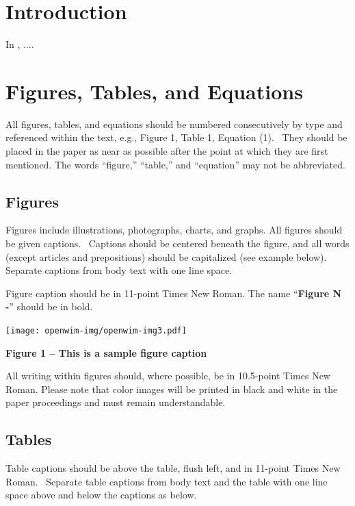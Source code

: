 \documentclass[a4paper]{article}
\begin{document}
\section{Introduction}
{
In , ....

\iffalse

\section{Figures, Tables, and Equations}
{
All figures, tables, and equations should be numbered consecutively by
type and referenced within the text, e.g., Figure 1, Table 1, Equation
(1). \ They should be placed in the paper as near as possible after the
point at which they are first mentioned. The words “figure,” “table,”
and “equation” may not be abbreviated.}

\subsection{Figures}
{
Figures include illustrations, photographs, charts, and graphs. All
figures should be given captions. \ Captions should be centered beneath
the figure, and all words (except articles and prepositions) should be
capitalized (see example below). Separate captions from body text with
one line space. }


\bigskip

{
Figure caption should be in 11-point Times New Roman. The name
“\textbf{Figure N -}” should be in bold.}


\bigskip

{\centering 
\texttt{[image: openwim-img/openwim-img3.pdf]}
\par}

{\centering{}\bfseries
Figure 1 – This is a sample figure caption
\par}


\bigskip

{
All writing within figures should, where possible, be in 10.5-point
Times New Roman. Please note that color images will be printed in black
and white in the paper proceedings and must remain understandable. }

\subsection{Tables}
{
Table captions should be above the table, flush left, and in 11-point
Times New Roman. \ Separate table captions from body text and the table
with one line space above and below the captions as below. \ }


}
\end{document}
